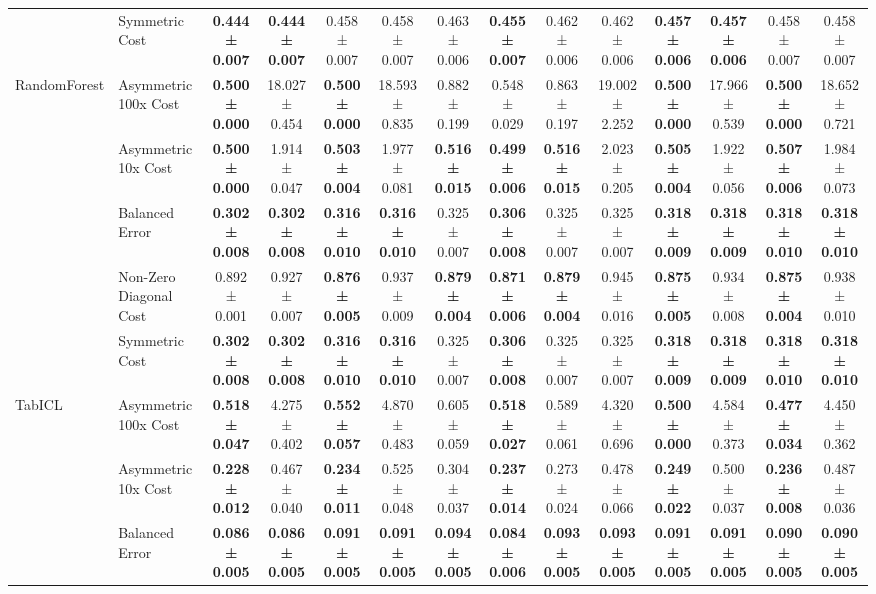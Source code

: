 \begin{table}[H]
{\begin{tabular}{llcccccccccccc}
 & Symmetric Cost & \textbf{0.444 ± 0.007} & \textbf{0.444 ± 0.007} & 0.458 ± 0.007 & 0.458 ± 0.007 & 0.463 ± 0.006 & \textbf{0.455 ± 0.007} & 0.462 ± 0.006 & 0.462 ± 0.006 & \textbf{0.457 ± 0.006} & \textbf{0.457 ± 0.006} & 0.458 ± 0.007 & 0.458 ± 0.007 \\
\cline{1-14}
\multirow[t]{5}{*}{RandomForest} & Asymmetric 100x Cost & \textbf{0.500 ± 0.000} & 18.027 ± 0.454 & \textbf{0.500 ± 0.000} & 18.593 ± 0.835 & 0.882 ± 0.199 & 0.548 ± 0.029 & 0.863 ± 0.197 & 19.002 ± 2.252 & \textbf{0.500 ± 0.000} & 17.966 ± 0.539 & \textbf{0.500 ± 0.000} & 18.652 ± 0.721 \\
 & Asymmetric 10x Cost & \textbf{0.500 ± 0.000} & 1.914 ± 0.047 & \textbf{0.503 ± 0.004} & 1.977 ± 0.081 & \textbf{0.516 ± 0.015} & \textbf{0.499 ± 0.006} & \textbf{0.516 ± 0.015} & 2.023 ± 0.205 & \textbf{0.505 ± 0.004} & 1.922 ± 0.056 & \textbf{0.507 ± 0.006} & 1.984 ± 0.073 \\
 & Balanced Error & \textbf{0.302 ± 0.008} & \textbf{0.302 ± 0.008} & \textbf{0.316 ± 0.010} & \textbf{0.316 ± 0.010} & 0.325 ± 0.007 & \textbf{0.306 ± 0.008} & 0.325 ± 0.007 & 0.325 ± 0.007 & \textbf{0.318 ± 0.009} & \textbf{0.318 ± 0.009} & \textbf{0.318 ± 0.010} & \textbf{0.318 ± 0.010} \\
 & Non-Zero Diagonal Cost & 0.892 ± 0.001 & 0.927 ± 0.007 & \textbf{0.876 ± 0.005} & 0.937 ± 0.009 & \textbf{0.879 ± 0.004} & \textbf{0.871 ± 0.006} & \textbf{0.879 ± 0.004} & 0.945 ± 0.016 & \textbf{0.875 ± 0.005} & 0.934 ± 0.008 & \textbf{0.875 ± 0.004} & 0.938 ± 0.010 \\
 & Symmetric Cost & \textbf{0.302 ± 0.008} & \textbf{0.302 ± 0.008} & \textbf{0.316 ± 0.010} & \textbf{0.316 ± 0.010} & 0.325 ± 0.007 & \textbf{0.306 ± 0.008} & 0.325 ± 0.007 & 0.325 ± 0.007 & \textbf{0.318 ± 0.009} & \textbf{0.318 ± 0.009} & \textbf{0.318 ± 0.010} & \textbf{0.318 ± 0.010} \\
\cline{1-14}
\multirow[t]{5}{*}{TabICL} & Asymmetric 100x Cost & \textbf{0.518 ± 0.047} & 4.275 ± 0.402 & \textbf{0.552 ± 0.057} & 4.870 ± 0.483 & 0.605 ± 0.059 & \textbf{0.518 ± 0.027} & 0.589 ± 0.061 & 4.320 ± 0.696 & \textbf{0.500 ± 0.000} & 4.584 ± 0.373 & \textbf{0.477 ± 0.034} & 4.450 ± 0.362 \\
 & Asymmetric 10x Cost & \textbf{0.228 ± 0.012} & 0.467 ± 0.040 & \textbf{0.234 ± 0.011} & 0.525 ± 0.048 & 0.304 ± 0.037 & \textbf{0.237 ± 0.014} & 0.273 ± 0.024 & 0.478 ± 0.066 & \textbf{0.249 ± 0.022} & 0.500 ± 0.037 & \textbf{0.236 ± 0.008} & 0.487 ± 0.036 \\
 & Balanced Error & \textbf{0.086 ± 0.005} & \textbf{0.086 ± 0.005} & \textbf{0.091 ± 0.005} & \textbf{0.091 ± 0.005} & \textbf{0.094 ± 0.005} & \textbf{0.084 ± 0.006} & \textbf{0.093 ± 0.005} & \textbf{0.093 ± 0.005} & \textbf{0.091 ± 0.005} & \textbf{0.091 ± 0.005} & \textbf{0.090 ± 0.005} & \textbf{0.090 ± 0.005} \\

\end{tabular}}
\end{table}
